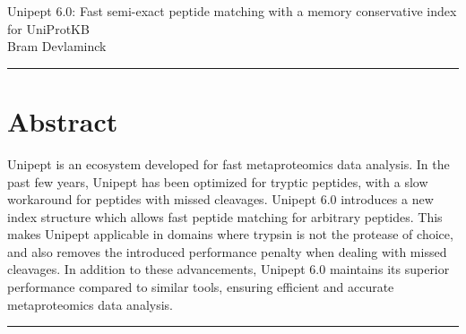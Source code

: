 \documentclass[11pt]{article}
\begin{document}
    \begingroup
    \centering
    \LARGE Unipept 6.0: Fast semi-exact peptide matching with a memory conservative index for UniProtKB\\[1em]
    \large Bram Devlaminck\\[2em]
    \endgroup

    \par\noindent\rule{\linewidth}{.5pt}
    \section*{Abstract}\label{sec:test-section}
    Unipept is an ecosystem developed for fast metaproteomics data analysis.
    In the past few years, Unipept has been optimized for tryptic peptides, with a slow workaround for peptides with missed cleavages.
    Unipept 6.0 introduces a new index structure which allows fast peptide matching for arbitrary peptides.
    This makes Unipept applicable in domains where trypsin is not the protease of choice, and also removes the introduced performance penalty when dealing with missed cleavages.
    In addition to these advancements, Unipept 6.0 maintains its superior performance compared to similar tools, ensuring efficient and accurate metaproteomics data analysis.
    \par\noindent\rule{\linewidth}{.5pt}
\end{document}
